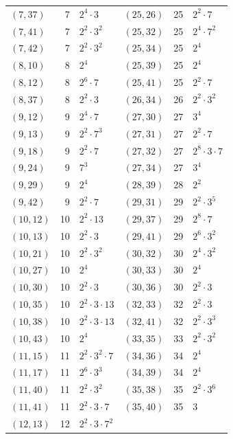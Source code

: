 \documentclass[11pt]{article}
\begin{document}
\begin{longtable}{@{}lrl@{\qquad}lrl@{}}
$(7,37)$ & 7 & $2^{4}\cdot 3$ & $(25,26)$ & 25 & $2^{2}\cdot 7$\\
$(7,41)$ & 7 & $2^{2}\cdot 3^{2}$ & $(25,32)$ & 25 & $2^{4}\cdot 7^{2}$\\
$(7,42)$ & 7 & $2^{2}\cdot 3^{2}$ & $(25,34)$ & 25 & $2^{4}$\\
$(8,10)$ & 8 & $2^{4}$ & $(25,39)$ & 25 & $2^{4}$\\
$(8,12)$ & 8 & $2^{6}\cdot 7$ & $(25,41)$ & 25 & $2^{2}\cdot 7$\\
$(8,37)$ & 8 & $2^{2}\cdot 3$ & $(26,34)$ & 26 & $2^{2}\cdot 3^{2}$\\
$(9,12)$ & 9 & $2^{4}\cdot 7$ & $(27,30)$ & 27 & $3^{4}$\\
$(9,13)$ & 9 & $2^{2}\cdot 7^{3}$ & $(27,31)$ & 27 & $2^{2}\cdot 7$\\
$(9,18)$ & 9 & $2^{2}\cdot 7$ & $(27,32)$ & 27 & $2^{8}\cdot 3\cdot 7$\\
$(9,24)$ & 9 & $7^{3}$ & $(27,34)$ & 27 & $3^{4}$\\
$(9,29)$ & 9 & $2^{4}$ & $(28,39)$ & 28 & $2^{2}$\\
$(9,42)$ & 9 & $2^{2}\cdot 7$ & $(29,31)$ & 29 & $2^{2}\cdot 3^{5}$\\
$(10,12)$ & 10 & $2^{2}\cdot 13$ & $(29,37)$ & 29 & $2^{8}\cdot 7$\\
$(10,13)$ & 10 & $2^{2}\cdot 3$ & $(29,41)$ & 29 & $2^{6}\cdot 3^{2}$\\
$(10,21)$ & 10 & $2^{2}\cdot 3^{2}$ & $(30,32)$ & 30 & $2^{4}\cdot 3^{2}$\\
$(10,27)$ & 10 & $2^{4}$ & $(30,33)$ & 30 & $2^{4}$\\
$(10,30)$ & 10 & $2^{2}\cdot 3$ & $(30,36)$ & 30 & $2^{2}\cdot 3$\\
$(10,35)$ & 10 & $2^{2}\cdot 3\cdot 13$ & $(32,33)$ & 32 & $2^{2}\cdot 3$\\
$(10,38)$ & 10 & $2^{2}\cdot 3\cdot 13$ & $(32,41)$ & 32 & $2^{2}\cdot 3^{3}$\\
$(10,43)$ & 10 & $2^{4}$ & $(33,35)$ & 33 & $2^{2}\cdot 3^{2}$\\
$(11,15)$ & 11 & $2^{2}\cdot 3^{2}\cdot 7$ & $(34,36)$ & 34 & $2^{4}$\\
$(11,17)$ & 11 & $2^{6}\cdot 3^{3}$ & $(34,39)$ & 34 & $2^{4}$\\
$(11,40)$ & 11 & $2^{2}\cdot 3^{2}$ & $(35,38)$ & 35 & $2^{2}\cdot 3^{6}$\\
$(11,41)$ & 11 & $2^{2}\cdot 3\cdot 7$ & $(35,40)$ & 35 & $3$\\
$(12,13)$ & 12 & $2^{2}\cdot 3\cdot 7^{2}$ & & &\\
\end{longtable}
\endgroup
\end{document}
